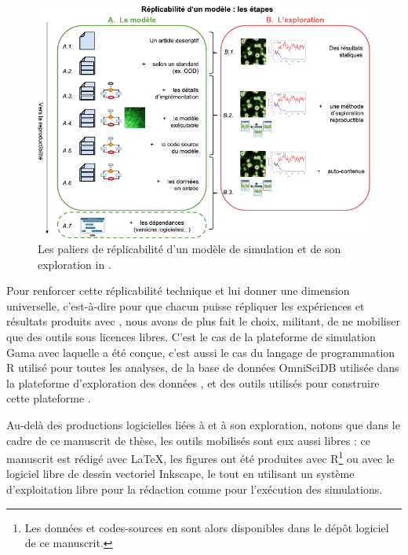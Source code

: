 \begin{figure}[H]
	\centering
	\includegraphics[width=\linewidth]{img/schema_reproductibilite.pdf}
	\caption[Les paliers de réplicabilité d’un modèle de simulation et de son exploration.]{\og Les paliers de réplicabilité d’un modèle de simulation et de son exploration \fg{} in \textcite[fig. 3, \ppno~427]{reycoyrehourcq:hal-01677950}.}
	\label{fig:paliers-replicabilite}
\end{figure}

Pour renforcer cette réplicabilité technique et lui donner une dimension universelle, c'est-à-dire pour que chacun puisse répliquer les expériences et résultats produits avec \simfeodal{}, nous avons de plus fait le choix, militant, de ne mobiliser que des outils sous licences libres.
C'est le cas de la plateforme de simulation Gama \autocite{taillandier_building_2018} avec laquelle \simfeodal{} a été conçue, c'est aussi le cas du langage de programmation R \autocite{r_core_team_r_2019} utilisé pour toutes les analyses, de la base de données OmniSciDB utilisée dans la plateforme d'exploration des données \autocite{root_mapd_2016}, et des outils utilisés pour construire cette plateforme \autocite[par exemple]{chang_shiny_2017}.

Au-delà des productions \og logicielles\fg{} liées à \simfeodal{} et à son exploration, notons que dans le cadre de ce manuscrit de thèse, les outils mobilisés sont eux aussi libres : ce manuscrit est rédigé avec \LaTeX, les figures ont été produites avec R\footnote{
	Les données et codes-sources en sont alors disponibles dans le dépôt logiciel de ce manuscrit.
} ou avec le logiciel libre de dessin vectoriel Inkscape, le tout en utilisant un système d'exploitation libre pour la rédaction comme pour l'exécution des simulations.

